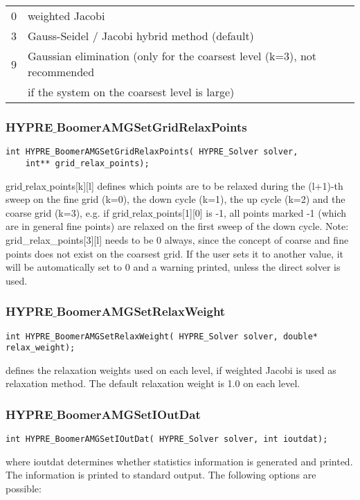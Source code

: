 \begin{tabular}{l l}
 0 & weighted Jacobi \\
 3 & Gauss-Seidel / Jacobi hybrid method (default) \\
 9 & Gaussian elimination (only for the coarsest level (k=3), not recommended\\ 
 & if the system on the coarsest level is large)\\
\end{tabular}

\subsubsection*{HYPRE$\_$BoomerAMGSetGridRelaxPoints}
\begin{display}
\begin{verbatim}
int HYPRE_BoomerAMGSetGridRelaxPoints( HYPRE_Solver solver, 
	int** grid_relax_points);
\end{verbatim}
\end{display}
grid$\_$relax$\_$points[k][l] defines which points are to be relaxed during
the (l+1)-th sweep on the fine 
grid (k=0), the down cycle (k=1), the up cycle (k=2) and the coarse grid (k=3),
e.g. if grid$\_$relax$\_$points[1][0] is -1, all points marked -1 (which are in
general fine points) are relaxed on the first sweep of the down cycle.
Note: grid\_relax\_points[3][l] needs to be 0 always, since the concept of 
coarse and fine points does not exist on the coarsest grid. If the user
sets it to another value, it will be automatically set to 0 and a warning
printed, unless the direct solver is used.

\subsubsection*{HYPRE$\_$BoomerAMGSetRelaxWeight}
\begin{display}
\begin{verbatim}
int HYPRE_BoomerAMGSetRelaxWeight( HYPRE_Solver solver, double* relax_weight);
\end{verbatim}
\end{display}
defines the relaxation weights used on each level, if weighted Jacobi is used
as relaxation method. The default relaxation weight is 1.0 on each level.

\subsubsection*{HYPRE$\_$BoomerAMGSetIOutDat}
\begin{display}
\begin{verbatim}
int HYPRE_BoomerAMGSetIOutDat( HYPRE_Solver solver, int ioutdat);
\end{verbatim}
\end{display}
where ioutdat determines whether statistics information is generated and 
printed. The information is printed to standard output.
The following options are possible:

